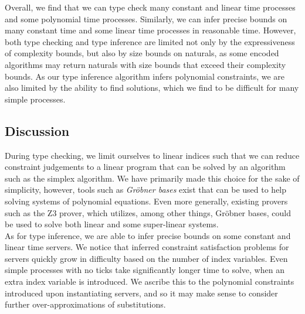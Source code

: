 
Overall, we find that we can type check many constant and linear time processes and some polynomial time processes. Similarly, we can infer precise bounds on many constant time and some linear time processes in reasonable time. However, both type checking and type inference are limited not only by the expressiveness of complexity bounds, but also by size bounds on naturals, as some encoded algorithms may return naturals with size bounds that exceed their complexity bounds. As our type inference algorithm infers polynomial constraints, we are also limited by the ability to find solutions, which we find to be difficult for many simple processes.

\subsection{Discussion}

During type checking, we limit ourselves to linear indices such that we can reduce constraint judgements to a linear program that can be solved by an algorithm such as the simplex algorithm. We have primarily made this choice for the sake of simplicity, however, tools such as \textit{Gröbner bases} exist that can be used to help solving systems of polynomial equations. Even more generally, existing provers such as the Z3 prover, which utilizes, among other things, Gröbner bases, could be used to solve both linear and some super-linear systems.\\

As for type inference, we are able to infer precise bounds on some constant and linear time servers. We notice that inferred constraint satisfaction problems for servers quickly grow in difficulty based on the number of index variables. Even simple processes with no ticks take significantly longer time to solve, when an extra index variable is introduced. We ascribe this to the polynomial constraints introduced upon instantiating servers, and so it may make sense to consider further over-approximations of substitutions.\\

